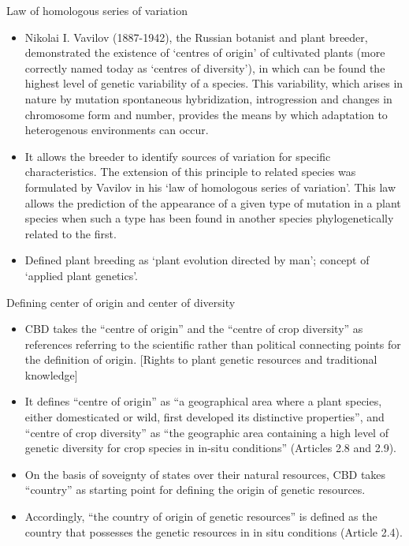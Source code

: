\documentclass[
  ignorenonframetext,
  aspectratio=169]{beamer}
\providecommand{\tightlist}{%
  \setlength{\itemsep}{0pt}\setlength{\parskip}{0pt}}
\begin{document}
\begin{frame}{Law of homologous series of variation}
\protect\hypertarget{law-of-homologous-series-of-variation}{}
\begin{itemize}
\tightlist
\item
  Nikolai I. Vavilov (1887-1942), the Russian botanist and plant
  breeder, demonstrated the existence of `centres of origin' of
  cultivated plants (more correctly named today as `centres of
  diversity'), in which can be found the highest level of genetic
  variability of a species. This variability, which arises in nature by
  mutation spontaneous hybridization, introgression and changes in
  chromosome form and number, provides the means by which adaptation to
  heterogenous environments can occur.
\item
  It allows the breeder to identify sources of variation for specific
  characteristics. The extension of this principle to related species
  was formulated by Vavilov in his `law of homologous series of
  variation'. This law allows the prediction of the appearance of a
  given type of mutation in a plant species when such a type has been
  found in another species phylogenetically related to the first.
\item
  Defined plant breeding as `plant evolution directed by man'; concept
  of `applied plant genetics'.
\end{itemize}
\end{frame}

\begin{frame}{Defining center of origin and center of diversity}
\protect\hypertarget{defining-center-of-origin-and-center-of-diversity}{}
\begin{itemize}
\tightlist
\item
  CBD takes the ``centre of origin'' and the ``centre of crop
  diversity'' as references referring to the scientific rather than
  political connecting points for the definition of origin. {[}Rights to
  plant genetic resources and traditional knowledge{]}
\item
  It defines ``centre of origin'' as ``a geographical area where a plant
  species, either domesticated or wild, first developed its distinctive
  properties'', and ``centre of crop diversity'' as ``the geographic
  area containing a high level of genetic diversity for crop species in
  in-situ conditions'' (Articles 2.8 and 2.9).
\item
  On the basis of soveignty of states over their natural resources, CBD
  takes ``country'' as starting point for defining the origin of genetic
  resources.
\item
  Accordingly, ``the country of origin of genetic resources'' is defined
  as the country that possesses the genetic resources in in situ
  conditions (Article 2.4).
\end{itemize}
\end{frame}
\end{document}
